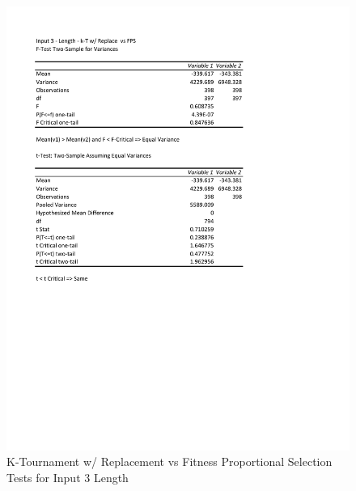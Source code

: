 \documentclass[times]{article}
\begin{document}
	\begin{figure}
		\caption{K-Tournament w/ Replacement vs Fitness Proportional Selection Tests for Input 3 Length}
		\label{fig:3parent1}
		\includegraphics[width=\textwidth]{./t_test/3_parent1.pdf}
	\end{figure}
\end{document}
